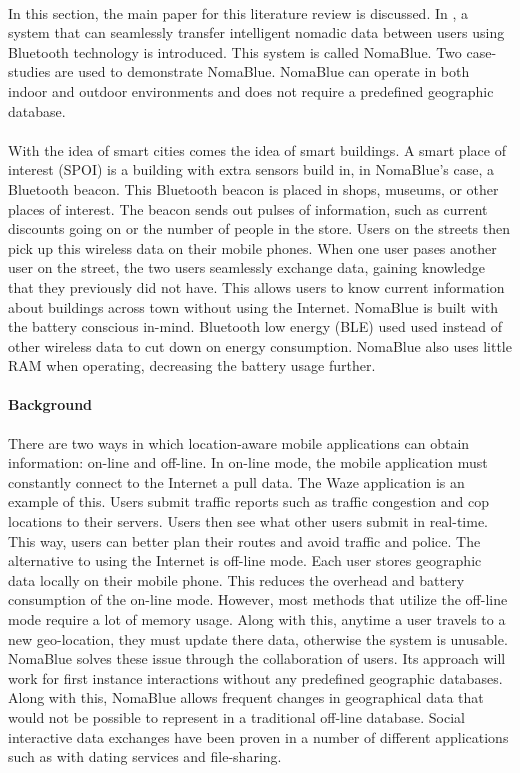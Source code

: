\documentclass[a4paper,12pt]{article}
\begin{document}
\paragraph{}
In this section, the main paper for this literature review is discussed. In \cite{SC}, a system that can seamlessly transfer intelligent nomadic data between users using Bluetooth technology is introduced. This system is called NomaBlue. Two case-studies are used to demonstrate NomaBlue. NomaBlue can operate in both indoor and outdoor environments and does not require a predefined geographic database.
\paragraph{}
With the idea of smart cities comes the idea of smart buildings. A smart place of interest (SPOI) is a building with extra sensors build in, in NomaBlue's case, a Bluetooth beacon. This Bluetooth beacon is placed in shops, museums, or other places of interest. The beacon sends out pulses of information, such as current discounts going on or the number of people in the store. Users on the streets then pick up this wireless data on their mobile phones. When one user pases another user on the street, the two users seamlessly exchange data, gaining knowledge that they previously did not have. This allows users to know current information about buildings across town without using the Internet. NomaBlue is built with the battery conscious in-mind. Bluetooth low energy (BLE) used used instead of other wireless data to cut down on energy consumption. NomaBlue also uses little RAM when operating, decreasing the battery usage further.
\paragraph{Background}
There are two ways in which location-aware mobile applications can obtain information: on-line and off-line. In on-line mode, the mobile application must constantly connect to the Internet a pull data. The Waze application \cite{waze} is an example of this. Users submit traffic reports such as traffic congestion and cop locations to their servers. Users then see what other users submit in real-time. This way, users can better plan their routes and avoid traffic and police. The alternative to using the Internet is off-line mode. Each user stores geographic data locally on their mobile phone. This reduces the overhead and battery consumption of the on-line mode. However, most methods that utilize the off-line mode require a lot of memory usage. Along with this, anytime a user travels to a new geo-location, they must update there data, otherwise the system is unusable. NomaBlue solves these issue through the collaboration of users. Its approach will work for first instance interactions without any predefined geographic databases. Along with this, NomaBlue allows frequent changes in geographical data that would not be possible to represent in a traditional off-line database. Social interactive data exchanges have been proven in a number of different applications such as with dating services and file-sharing.
\end{document}
